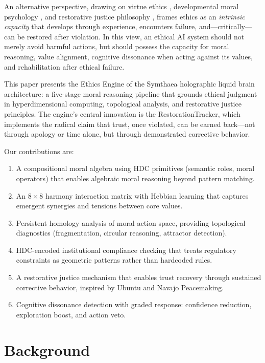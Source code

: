 \documentclass[11pt,a4paper]{article}
\begin{document}
An alternative perspective, drawing on virtue ethics \citep{aristotle_nic}, developmental moral psychology \citep{kohlberg1981}, and restorative justice philosophy \citep{zehr2002}, frames ethics as an \emph{intrinsic capacity} that develops through experience, encounters failure, and---critically---can be restored after violation. In this view, an ethical AI system should not merely avoid harmful actions, but should possess the capacity for moral reasoning, value alignment, cognitive dissonance when acting against its values, and rehabilitation after ethical failure.

This paper presents the Ethics Engine of the Symthaea holographic liquid brain architecture: a five-stage moral reasoning pipeline that grounds ethical judgment in hyperdimensional computing, topological analysis, and restorative justice principles. The engine's central innovation is the RestorationTracker, which implements the radical claim that trust, once violated, can be earned back---not through apology or time alone, but through demonstrated corrective behavior.

Our contributions are:

\begin{enumerate}
  \item A compositional moral algebra using HDC primitives (semantic roles, moral operators) that enables algebraic moral reasoning beyond pattern matching.
  \item An $8 \times 8$ harmony interaction matrix with Hebbian learning that captures emergent synergies and tensions between core values.
  \item Persistent homology analysis of moral action space, providing topological diagnostics (fragmentation, circular reasoning, attractor detection).
  \item HDC-encoded institutional compliance checking that treats regulatory constraints as geometric patterns rather than hardcoded rules.
  \item A restorative justice mechanism that enables trust recovery through sustained corrective behavior, inspired by Ubuntu and Navajo Peacemaking.
  \item Cognitive dissonance detection with graded response: confidence reduction, exploration boost, and action veto.
\end{enumerate}

\section{Background}
\end{document}
